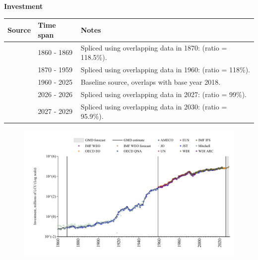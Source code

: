 \documentclass[12pt,a4paper,landscape]{article}
\begin{document}
\begin{adjustbox}{max totalsize={\paperwidth}{\paperheight},center}
\begin{minipage}[t][\textheight][t]{\textwidth}
\vspace*{0.5cm}
{}
\begin{center}
{\Large\bfseries Investment}
\end{center}
\vspace{0.5cm}
\begin{table}[H]
\centering
\small
\begin{tabular}{|l|l|l|}
\hline
\textbf{Source} & \textbf{Time span} & \textbf{Notes} \\
\hline
\rowcolor{white}\cite{Mitchell}& 1860 - 1869 &Spliced using overlapping data in 1870: (ratio = 118.5\%). \\
\rowcolor{lightgray}\cite{JST}& 1870 - 1959 &Spliced using overlapping data in 1960: (ratio = 118\%). \\
\rowcolor{white}\cite{OECD_EO}& 1960 - 2025 &Baseline source, overlaps with base year 2018. \\
\rowcolor{lightgray}\cite{AMECO}& 2026 - 2026 &Spliced using overlapping data in 2027: (ratio = 99\%). \\
\rowcolor{white}\cite{IMF_WEO_forecast}& 2027 - 2029 &Spliced using overlapping data in 2030: (ratio = 95.9\%). \\
\hline
\end{tabular}
\end{table}
\begin{figure}[H]
\centering
\includegraphics[width=\textwidth,height=0.6\textheight,keepaspectratio]{graphs/FIN_inv.pdf}
\end{figure}
\end{minipage}
\end{adjustbox}
\end{document}
